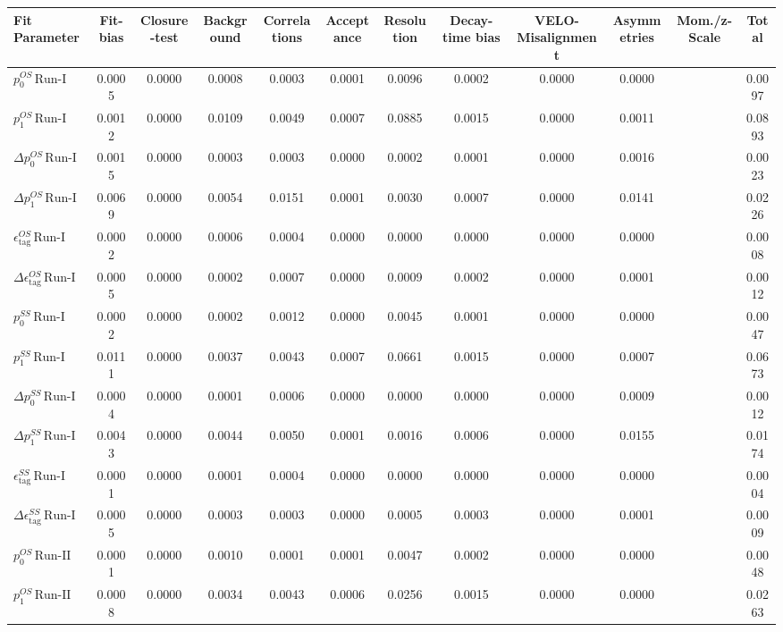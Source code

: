 \begin{tabular}{l  c  c  c  c  c  c  c  c  c  c  | c }
\hline
\hline
Fit Parameter & Fit-bias & Closure-test & Background & Correlations & Acceptance & Resolution & Decay-time bias & VELO-Misalignment & Asymmetries & Mom./z-Scale &  Total  \\ 
\hline
$p_{0}^{OS} \, \text{Run-I}$ & 0.0005 & 0.0000 & 0.0008 & 0.0003 & 0.0001 & 0.0096 & 0.0002 & 0.0000 & 0.0000 &  & 0.0097 \\ 
$p_{1}^{OS} \, \text{Run-I}$ & 0.0012 & 0.0000 & 0.0109 & 0.0049 & 0.0007 & 0.0885 & 0.0015 & 0.0000 & 0.0011 &  & 0.0893 \\ 
$\Delta p_{0}^{OS} \, \text{Run-I}$ & 0.0015 & 0.0000 & 0.0003 & 0.0003 & 0.0000 & 0.0002 & 0.0001 & 0.0000 & 0.0016 &  & 0.0023 \\ 
$\Delta p_{1}^{OS} \, \text{Run-I}$ & 0.0069 & 0.0000 & 0.0054 & 0.0151 & 0.0001 & 0.0030 & 0.0007 & 0.0000 & 0.0141 &  & 0.0226 \\ 
$\epsilon_{\text{tag}}^{OS} \, \text{Run-I}$ & 0.0002 & 0.0000 & 0.0006 & 0.0004 & 0.0000 & 0.0000 & 0.0000 & 0.0000 & 0.0000 &  & 0.0008 \\ 
$\Delta \epsilon_{\text{tag}}^{OS} \, \text{Run-I}$ & 0.0005 & 0.0000 & 0.0002 & 0.0007 & 0.0000 & 0.0009 & 0.0002 & 0.0000 & 0.0001 &  & 0.0012 \\ 
$p_{0}^{SS} \, \text{Run-I}$ & 0.0002 & 0.0000 & 0.0002 & 0.0012 & 0.0000 & 0.0045 & 0.0001 & 0.0000 & 0.0000 &  & 0.0047 \\ 
$p_{1}^{SS} \, \text{Run-I}$ & 0.0111 & 0.0000 & 0.0037 & 0.0043 & 0.0007 & 0.0661 & 0.0015 & 0.0000 & 0.0007 &  & 0.0673 \\ 
$\Delta p_{0}^{SS} \, \text{Run-I}$ & 0.0004 & 0.0000 & 0.0001 & 0.0006 & 0.0000 & 0.0000 & 0.0000 & 0.0000 & 0.0009 &  & 0.0012 \\ 
$\Delta p_{1}^{SS} \, \text{Run-I}$ & 0.0043 & 0.0000 & 0.0044 & 0.0050 & 0.0001 & 0.0016 & 0.0006 & 0.0000 & 0.0155 &  & 0.0174 \\ 
$\epsilon_{\text{tag}}^{SS} \, \text{Run-I}$ & 0.0001 & 0.0000 & 0.0001 & 0.0004 & 0.0000 & 0.0000 & 0.0000 & 0.0000 & 0.0000 &  & 0.0004 \\ 
$\Delta \epsilon_{\text{tag}}^{SS} \, \text{Run-I}$ & 0.0005 & 0.0000 & 0.0003 & 0.0003 & 0.0000 & 0.0005 & 0.0003 & 0.0000 & 0.0001 &  & 0.0009 \\ 
$p_{0}^{OS} \, \text{Run-II}$ & 0.0001 & 0.0000 & 0.0010 & 0.0001 & 0.0001 & 0.0047 & 0.0002 & 0.0000 & 0.0000 &  & 0.0048 \\ 
$p_{1}^{OS} \, \text{Run-II}$ & 0.0008 & 0.0000 & 0.0034 & 0.0043 & 0.0006 & 0.0256 & 0.0015 & 0.0000 & 0.0000 &  & 0.0263 \\ 

\end{tabular}

